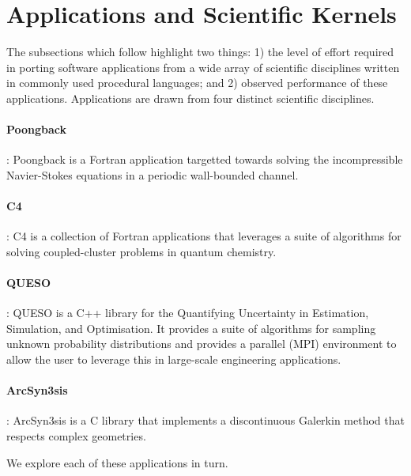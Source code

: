 \section{Applications and Scientific Kernels}
\label{sec:apps}

The subsections which follow highlight two things: 1) the level of effort
required in porting software applications from a wide array of scientific
disciplines written in commonly used procedural languages; and 2) observed
performance of these applications.  Applications are drawn from four distinct
scientific disciplines.

\paragraph{Poongback}:  Poongback is a Fortran application targetted towards
solving the incompressible Navier-Stokes equations in a periodic wall-bounded
channel.

\paragraph{C4}:  C4 is a collection of Fortran applications that leverages a
suite of algorithms for solving coupled-cluster problems in quantum chemistry.

\paragraph{QUESO}:  QUESO is a C++ library for the Quantifying Uncertainty in
Estimation, Simulation, and Optimisation.  It provides a suite of algorithms
for sampling unknown probability distributions and provides a parallel (MPI)
environment to allow the user to leverage this in large-scale engineering
applications.

\paragraph{ArcSyn3sis}:  ArcSyn3sis is a C library that implements a
discontinuous Galerkin method that respects complex geometries.

We explore each of these applications in turn.
